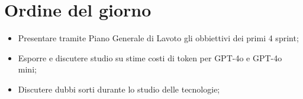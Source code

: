 

\section{Ordine del giorno}

\begin{itemize}
    \item Presentare tramite Piano Generale di Lavoto gli obbiettivi dei primi 4 sprint;
    \item Esporre e discutere studio su stime costi di token per GPT-4o e GPT-4o mini;
    \item Discutere dubbi sorti durante lo studio delle tecnologie;
\end{itemize}

